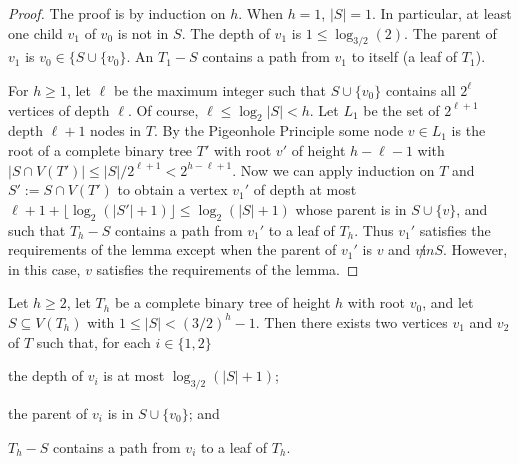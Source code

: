 \documentclass{patmorin}
\begin{document}
\begin{proof}
  The proof is by induction on $h$.  When $h=1$, $|S|= 1$. In particular, at least one child $v_1$ of $v_0$ is not in $S$.  The depth of $v_1$ is $1\le \log_{3/2}(2)$.  The parent of $v_1$ is $v_0\in\{S\cup\{v_0\}$.  An $T_1-S$ contains a path from $v_1$ to itself (a leaf of $T_1$).

  For $h\ge 1$, let $\ell$ be the maximum integer such that $S\cup\{v_0\}$ contains all $2^\ell$ vertices of depth $\ell$.  Of course, $\ell \le \log_2 |S| < h$.  Let $L_1$ be the set of $2^{\ell+1}$ depth $\ell+1$ nodes in $T$.  By the Pigeonhole Principle some node $v\in L_1$ is the root of a complete binary tree $T'$ with root $v'$ of height $h-\ell-1$ with $|S\cap V(T')| \le |S|/2^{\ell+1} < 2^{h-\ell+1}$.  Now we can apply induction on $T$ and $S':=S\cap V(T')$ to obtain a vertex $v_1'$ of depth at most $\ell+1+\lfloor \log_2(|S'|+1)\rfloor \le \log_2(|S|+1)$ whose parent is in $S\cup\{v\}$, and such that $T_h-S$ contains a path from $v_1'$ to a leaf of $T_h$.  Thus $v_1'$ satisfies the requirements of the lemma except when the parent of $v_1'$ is $v$ and $v\not in S$.  However, in this case, $v$ satisfies the requirements of the lemma.
\end{proof}

\begin{lem}\label{two_paths}
  Let $h\ge 2$, let $T_h$ be a complete binary tree of height $h$ with root $v_0$, and let $S\subseteq V(T_h)$ with $1\le |S|< (3/2)^h-1$. Then there exists two vertices $v_1$ and $v_2$ of $T$ such that, for each $i\in\{1,2\}$ 
  \begin{compactenum}[(i)]
    \item the depth of $v_i$ is at most $\log_{3/2}(|S|+1)$;
    \item the parent of $v_i$ is in $S\cup\{v_0\}$; and
    \item $T_h-S$ contains a path from $v_i$ to a leaf of $T_h$.
  \end{compactenum} 
\end{lem}
\end{document}
